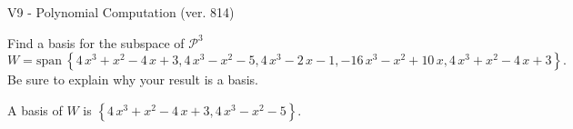 \begin{exercise}
  \begin{exerciseTitle}V9 - Polynomial Computation (ver. 814)\end{exerciseTitle}
  \begin{exerciseStatement}
    Find a basis for the subspace of \(\mathcal{P}^3\) 
\[W=\mathrm{span}\ \left\{4 \, x^{3} + x^{2} - 4 \, x + 3 , 4 \, x^{3} - x^{2} - 5 , 4 \, x^{3} - 2 \, x - 1 , -16 \, x^{3} - x^{2} + 10 \, x , 4 \, x^{3} + x^{2} - 4 \, x + 3\right\}.\]
 Be sure to explain why your result is a basis.


  \end{exerciseStatement}
  \begin{exerciseAnswer}
   A basis of \(W\) is  \(\left\{4 \, x^{3} + x^{2} - 4 \, x + 3 , 4 \, x^{3} - x^{2} - 5\right\}\).
  


  \end{exerciseAnswer}
\end{exercise}